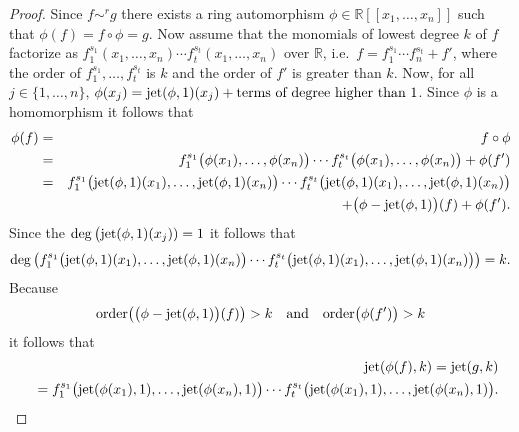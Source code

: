 \documentclass{amsproc}
\begin{document}
\begin{proof}
Since $f\sim^rg$ there exists a ring automorphism $\phi\in\mathbb R[[x_1,\ldots,x_n]]$ such that  $\phi(f)=f\circ\phi=g$. Now assume that the monomials of lowest degree $k$ of $f$ factorize as $f_1^{s_1}(x_1,\ldots,x_n)\cdots f_t^{s_t}(x_1,\ldots,x_n)$ over $\mathbb R$, i.e.~$f=f_1^{s_1}\cdots f_n^{s_t}+f'$, where the order of $f_1^{s_1},\ldots,f_t^{s_t}$ is $k$ and the order of $f'$ is greater than $k$. 
Now, for all $j\in\{1,\ldots,n\}$, $\phi(x_j)=\textnormal{jet}(\phi,1)(x_j)+\textnormal{terms of degree higher than $1$}$. Since $\phi$ is a homomorphism it follows that
\begin{eqnarray*}\phi(f)&=&f\circ\phi\\&=&f_1^{s_1}\big(\phi(x_1),\ldots,\phi(x_n)\big)\cdots f_t^{s_t}\big(\phi(x_1),\ldots,\phi(x_n)\big)+\phi(f')\\&=&f_1^{s_1}\big(\textnormal{jet}(\phi,1)(x_1),\ldots,\textnormal{jet}(\phi,1)(x_n)\big)\cdots f_t^{s_t}\big(\textnormal{jet}(\phi,1)(x_1),\ldots,\textnormal{jet}(\phi,1)(x_n)\big)\\&&+\big(\phi-\textnormal{jet}(\phi,1)\big)(f)+\phi(f').\\\end{eqnarray*}
Since the $\deg\big(\textnormal{jet}(\phi,1)(x_j))=1$ it follows that \[\deg\big(f_1^{s_1}\big(\textnormal{jet}(\phi,1)(x_1),\ldots,\textnormal{jet}(\phi,1)(x_n)\big)\cdots f_t^{s_t}\big(\textnormal{jet}(\phi,1)(x_1),\ldots,\textnormal{jet}(\phi,1)(x_n)\big)\big)=k.\] Because 
\[\textnormal{order}\big(\big(\phi-\textnormal{jet}(\phi,1)\big)(f)\big)>k\quad\textnormal{and}\quad\textnormal{order}\big(\phi(f')\big)>k\]
it follows that
\begin{eqnarray*}
&&\textnormal{jet}(\phi(f),k)=\textnormal{jet}(g,k)\\&&=f_1^{s_1}\big(\textnormal{jet}(\phi(x_1),1),\ldots,\textnormal{jet}(\phi(x_n),1)\big)\cdots f_t^{s_t}\big(\textnormal{jet}(\phi(x_1),1),\ldots,\textnormal{jet}(\phi(x_n),1)\big).
\end{eqnarray*}
\end{proof}
\end{document}

